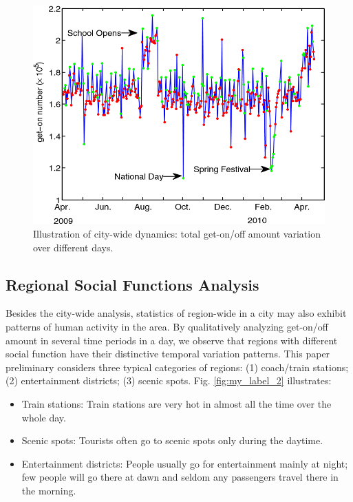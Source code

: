 \documentclass[a4paper, 10pt, conference]{ieeeconf}      %
\begin{document}
\begin{figure}[htbp]
    \centering
    \includegraphics{fig/f1.png}
    \caption{Illustration of city-wide dynamics: total get-on/off amount variation over different days.}
    \label{fig:my_label_1}
\end{figure}

\subsection{Regional Social Functions Analysis}Besides the city-wide analysis, statistics of region-wide in a city may also exhibit patterns of human activity in the area. By qualitatively analyzing get-on/off amount in several time periods in a day, we observe that regions with different social function have their distinctive temporal variation patterns.
This paper preliminary considers three typical categories of regions: (1) coach/train stations; (2) entertainment districts; (3) scenic spots. Fig. \ref{fig:my_label_2} illustrates:

\begin{itemize}

\item Train stations: Train stations are very hot in almost all the time over the whole day.
\item Scenic spots: Tourists often go to scenic spots only during the daytime.
\item Entertainment districts: People usually go for entertainment mainly at night; few people will go there at dawn and seldom any passengers travel there in the morning.

\end{itemize}
\end{document}
